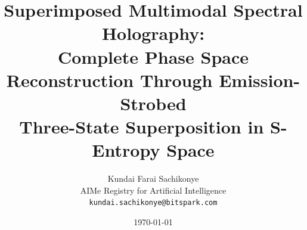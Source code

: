\documentclass[11pt,a4paper]{article}
\theoremstyle{definition}
\theoremstyle{remark}
\begin{document}
\title{\textbf{Superimposed Multimodal Spectral Holography: \\[4pt]
Complete Phase Space Reconstruction Through Emission-Strobed \\[4pt]
Three-State Superposition in S-Entropy Space}}

\author{
Kundai Farai Sachikonye\\
AIMe Registry for Artificial Intelligence\\
\texttt{kundai.sachikonye@bitspark.com}
}

\date{\today}

\maketitle

\end{document}
